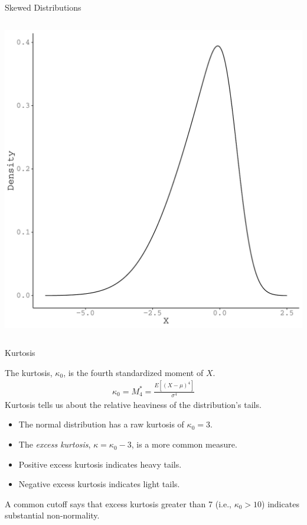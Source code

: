 \documentclass{beamer}\usepackage[]{graphicx}\usepackage[]{color}
\newenvironment{knitrout}{}{} %
\begin{document}
\begin{frame}{Skewed Distributions}
\begin{columns}
\begin{column}{0.5\textwidth}
\begin{knitrout}
{}




{\centering \includegraphics[width=0.6\linewidth]{figure/unnamed-chunk-25-2} 

}



\end{knitrout}

\end{column}
\end{columns}
  
\end{frame}

\watermarkon %

\begin{frame}{Kurtosis}
  
  The kurtosis, $\kappa_0$, is the fourth standardized moment of $X$.
  \begin{align*}
    \kappa_0 = M_4^* = \frac{E\left[(X - \mu)^4\right]}{\sigma^4}
  \end{align*}
  Kurtosis tells us about the relative heaviness of the distribution's tails.
  \begin{itemize}
  \item The normal distribution has a raw kurtosis of $\kappa_0 = 3$.
  \item The \emph{excess kurtosis}, $\kappa = \kappa_0 - 3$, is a more common 
    measure.
  \item Positive excess kurtosis indicates heavy tails.
  \item Negative excess kurtosis indicates light tails.
  \end{itemize}
  \vb 
  A common cutoff says that excess kurtosis greater than 7 (i.e., 
  $\kappa_0 > 10$) indicates substantial non-normality.
  
\end{frame}
\end{document}
